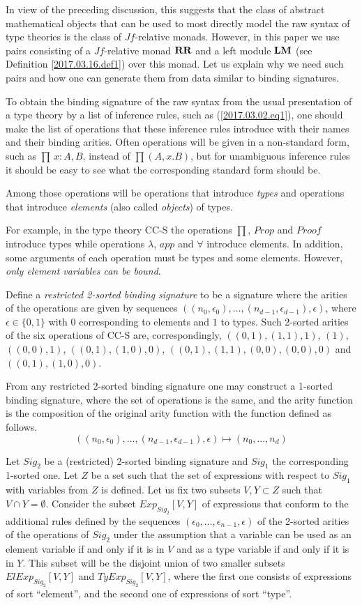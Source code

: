 \documentclass[onecolumn,12pt]{amsart}
\numberwithin{proposition}{subsection}
\newcommand{\RR}{{\bf RR}}
\newcommand{\LM}{{\bf LM}}
\begin{document}
In view of the preceding discussion, this suggests that the class of abstract
mathematical objects that can be used to most directly model the raw syntax of
type theories is the class of $Jf$-relative monads. However, in this paper we
use pairs consisting of a $Jf$-relative monad $\RR$ and a left module $\LM$ (see
Definition \ref{2017.03.16.def1}) over this monad. Let us explain why we need
such pairs and how one can generate them from data similar to binding
signatures.

To obtain the binding signature of the raw syntax from the usual presentation
of a type theory by a list of inference rules, such as (\ref{2017.03.02.eq1}),
one should make the list of operations that these inference rules introduce
with their names and their binding arities. Often operations will be given in a
non-standard form, such as $\prod\,x:A,B$, instead of $\prod(A,x.B)$, but for
unambiguous inference rules it should be easy to see what the corresponding
standard form should be.

Among those operations will be operations that introduce {\em types} and
operations that introduce {\em elements} (also called {\em objects}) of types.

For example, in the type theory CC-S the operations $\prod$, $Prop$ and $Proof$
introduce types while operations $\lambda$, $app$ and $\forall$ introduce
elements.  In addition, some arguments of each operation must be types and some
elements. However, {\em only element variables can be bound}.

Define a {\em restricted 2-sorted binding signature} to be a signature where the arities of the
operations are given by sequences
$((n_0,\epsilon_0),\dots,(n_{d-1},\epsilon_{d-1}),\epsilon)$, where
$\epsilon\in\{0,1\}$ with $0$ corresponding to elements and $1$ to types. Such
2-sorted arities of the six operations of CC-S are, correspondingly,
$((0,1),(1,1),1)$, $(1)$, $((0,0),1)$, $((0,1),(1,0),0)$,
$((0,1),(1,1),(0,0),(0,0),0)$ and $((0,1),(1,0),0)$.

From any restricted 2-sorted binding signature one may construct a 1-sorted binding signature,
where the set of operations is the same, and the arity function is the
composition of the original arity function with the function defined as follows.
$$((n_0,\epsilon_0),\dots,(n_{d-1},\epsilon_{d-1}),\epsilon) \mapsto (n_0,\dots,n_d)$$

Let $Sig_2$ be a (restricted) 2-sorted binding signature and $Sig_1$ the
corresponding 1-sorted one. Let $Z$ be a set such that the set of expressions
with respect to $Sig_1$ with variables from $Z$ is defined. Let us fix two
subsets $V,Y\subset Z$ such that $V\cap Y=\emptyset$. Consider the subset
$Exp_{Sig_2}[V,Y]$ of expressions that conform to the additional rules defined
by the sequences $(\epsilon_0,\dots,\epsilon_{n-1},\epsilon)$ of the 2-sorted
arities of the operations of $Sig_2$ under the assumption that a variable can
be used as an element variable if and only if it is in $V$ and as a type
variable if and only if it is in $Y$. This subset will be the disjoint union of
two smaller subsets $ElExp_{Sig_2}[V,Y]$ and $TyExp_{Sig_2}[V,Y]$, where the
first one consists of expressions of sort ``element'', and the second one of
expressions of sort ``type''.
\end{document}
